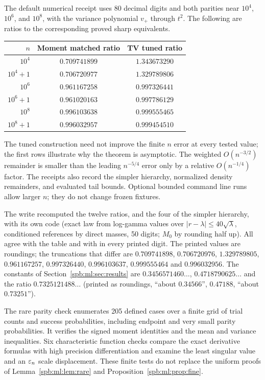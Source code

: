 The default numerical receipt uses 80 decimal digits and both parities near $10^4$, $10^6$, and $10^8$, with the variance polynomial $v_+$ through $t^2$. The following are ratios to the corresponding proved sharp equivalents.
\begin{center}
\begin{tabular}{rcc}
\toprule
$n$ & Moment matched ratio & TV tuned ratio\\
\midrule
$10^4$   & $0.709741899$ & $1.343673290$\\
$10^4+1$ & $0.706720977$ & $1.329789806$\\
$10^6$   & $0.961167258$ & $0.997326441$\\
$10^6+1$ & $0.961020163$ & $0.997786129$\\
$10^8$   & $0.996103638$ & $0.999555465$\\
$10^8+1$ & $0.996032957$ & $0.999454510$\\
\bottomrule
\end{tabular}
\end{center}
The tuned construction need not improve the finite $n$ error at every tested value; the first rows illustrate why the theorem is asymptotic. The weighted $O(n^{-3/2})$ remainder is smaller than the leading $n^{-5/4}$ error only by a relative $O(n^{-1/4})$ factor. The receipts also record the simpler hierarchy, normalized density remainders, and evaluated tail bounds. Optional bounded command line runs allow larger $n$; they do not change frozen fixtures.
\begin{writenote}
The write recomputed the twelve ratios, and the four of the simpler
hierarchy, with its own code (exact law from log-gamma values over
$|r-\lambda|\le40\sqrt\lambda$, conditioned references by direct masses, 50
digits; $M_0$ by rounding half up). All agree with the table and with
 in every printed digit. The
printed values are roundings; the truncations that differ are $0.709741898$,
$0.706720976$, $1.329789805$, $0.961167257$, $0.997326440$, $0.996103637$,
$0.999555464$ and $0.996032956$. The constants of
Section~\ref{spb:ml:sec:results} are $0.3456571460\ldots$,
$0.4718790625\ldots$ and the ratio $0.7325121488\ldots$ (printed as roundings,
``about $0.34566$'', $0.47188$, ``about $0.73251$'').
\end{writenote}

The rare parity check enumerates 205 defined cases over a finite grid of trial counts and success probabilities, including endpoint and very small parity probabilities. It verifies the signed moment identities and the mean and variance inequalities. Six characteristic function checks compare the exact derivative formulas with high precision differentiation and examine the least singular value and an $\varepsilon_n$ scale displacement. These finite tests do not replace the uniform proofs of Lemma~\ref{spb:ml:lem:rare} and Proposition~\ref{spb:ml:prop:fine}.

